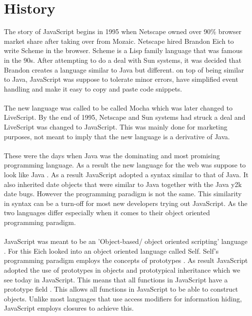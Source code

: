 \section{History}
The story of JavaScript begins in 1995 when Netscape owned over 90\% browser market share after taking over from Mozaic. Netscape hired Brandon Eich to write Scheme in the browser. Scheme is a Lisp family language that was famous in the 90s\cite{findler_c}. After attempting to do a deal with Sun systems, it was decided that Brandon creates a language similar to Java but different. on top of being similar to Java, JavaScript was suppose to tolerate minor errors, have simplified event handling and make it easy to copy and paste code snippets.
\paragraph{}
The new language was called to be called Mocha which was later changed to LiveScript. By the end of 1995, Netscape and Sun systems had struck a deal and LiveScript was changed to JavaScript\cite{JS}. This was mainly done for marketing purposes, not meant to imply that the new language is a derivative of Java\cite{JS}. 
\paragraph{}
These were the days when Java was the dominating and most promising programming language. As a result the new language for the web was suppose to look like Java \cite{JS}. As a result JavaScript adopted a syntax similar to that of Java. It also inherited date objects that were similar to Java together with the Java y2k date bugs\cite{Eich:2005:JTY:1090189.1086382}. However the programming paradigm is not the same. This similarity in syntax can be a turn-off for most new developers trying out JavaScript. As the two languages differ especially when it comes to their object oriented programming paradigm.
\paragraph{}
JavaScript was meant to be an 'Object-based/ object oriented scripting' language \cite{Eich:2005:JTY:1090189.1086382}. For this Eich looked into an object oriented language called Self. Self's programming paradigm employs the concepts of prototypes \cite{Ungar:1987:SPS:38807.38828}. As result JavaScript adopted the use of prototypes in objects and prototypical inheritance which we see today in JavaScript. This means that all functions in JavaScript have a prototype field \cite{Eich:2005:JTY:1090189.1086382}. This allows all functions in JavaScript to be able to construct objects. Unlike most languages that use access modifiers for information hiding, JavaScript employs closures to achieve this.
